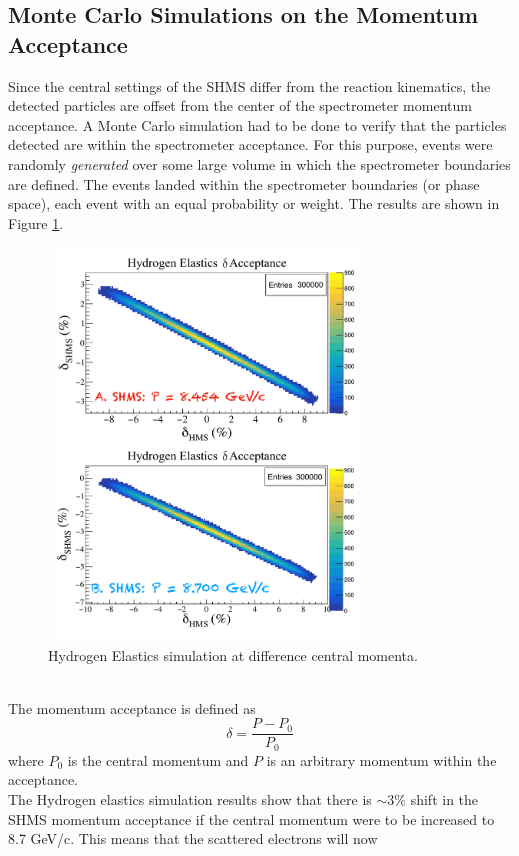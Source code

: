 \documentclass[letterpaper, 12 pt, conference]{ieeeconf}  %
\begin{document}
\subsection{ Monte Carlo Simulations on the Momentum Acceptance }
\noindent Since the central settings of the SHMS differ from the reaction kinematics, the detected particles are
offset from the center of the spectrometer momentum acceptance. A Monte Carlo simulation had to be done to verify
that the particles detected are within the spectrometer acceptance. For this purpose, events were randomly \textit{generated} over some large volume in which the spectrometer boundaries are defined. The  events landed within the
spectrometer boundaries (or phase space), each event with an equal probability or weight. The results are shown in Figure \ref{fig:h_elastics}. 
\begin{figure}[h!]
  \centering
  \includegraphics[width=3.3in, height=4.1in]{deut_kin/h_elast.pdf}
  \caption{Hydrogen Elastics simulation at difference central momenta.}
  \label{fig:h_elastics}
\end{figure} \\
The momentum acceptance is defined as
\begin{equation}
\delta = \frac{P - P_{0}}{P_{0}}
\end{equation}
where $P_{0}$ is the central momentum and $P$ is an arbitrary momentum within the acceptance. \\
\indent The Hydrogen elastics simulation results show that there is $\sim$3$\%$ shift in the SHMS momentum acceptance
if the central momentum were to be increased to 8.7 GeV/c. This means that the scattered electrons will now
\end{document}

